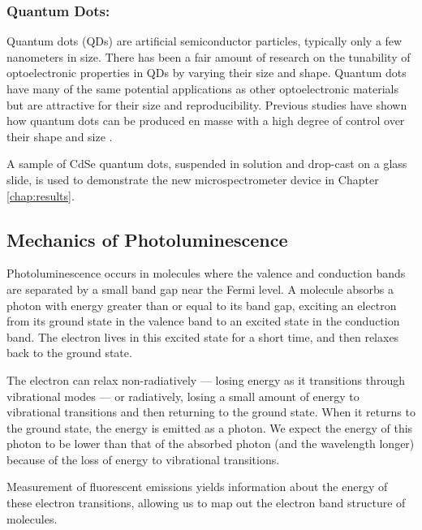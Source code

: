 \subsubsection{Quantum Dots: }\label{chap:intro-optomats-qd}

Quantum dots (QDs) are artificial semiconductor particles, typically only a few nanometers in size. There has been a fair amount of research on the tunability of optoelectronic properties in QDs by varying their size and shape. Quantum dots have many of the same potential applications as other optoelectronic materials but are attractive for their size and reproducibility. Previous studies have shown how quantum dots can be produced en masse with a high degree of control over their shape and size \cite{empedocles_photoluminescence_1996, murray_synthesis_2000}.

A sample of CdSe quantum dots, suspended in solution and drop-cast on a glass slide, is used to demonstrate the new microspectrometer device in Chapter \ref{chap:results}.

\subsection{Mechanics of Photoluminescence}
Photoluminescence occurs in molecules where the valence and conduction bands are separated by a small band gap near the Fermi level. A molecule absorbs a photon with energy greater than or equal to its band gap, exciting an electron from its ground state in the valence band to an excited state in the conduction band. The electron lives in this excited state for a short time, and then relaxes back to the ground state.

The electron can relax non-radiatively --- losing energy as it transitions through vibrational modes --- or radiatively, losing a small amount of energy to vibrational transitions and then returning to the ground state. When it returns to the ground state, the energy is emitted as a photon. We expect the energy of this photon to be lower than that of the absorbed photon (and the wavelength longer) because of the loss of energy to vibrational transitions.


Measurement of fluorescent emissions yields information about the energy of these electron transitions, allowing us to map out the electron band structure of molecules.
